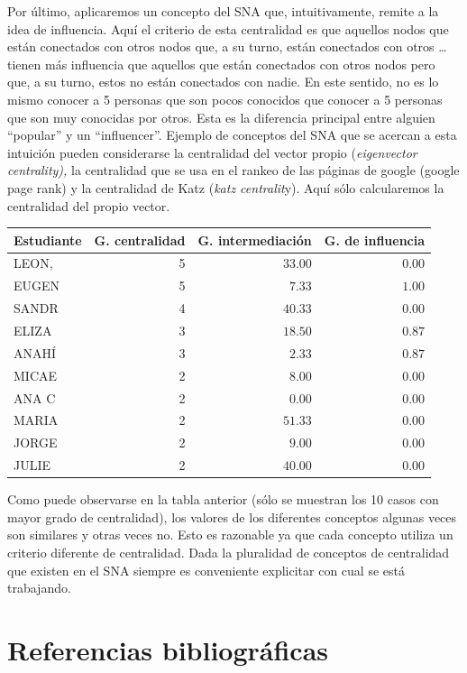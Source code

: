 \documentclass[
  letterpaper,
  DIV=11,
  numbers=noendperiod]{scrreprt}
\begin{document}
Por último, aplicaremos un concepto del SNA que, intuitivamente, remite
a la idea de influencia. Aquí el criterio de esta centralidad es que
aquellos nodos que están conectados con otros nodos que, a su turno,
están conectados con otros \ldots{} tienen más influencia que aquellos
que están conectados con otros nodos pero que, a su turno, estos no
están conectados con nadie. En este sentido, no es lo mismo conocer a 5
personas que son pocos conocidos que conocer a 5 personas que son muy
conocidas por otros. Esta es la diferencia principal entre alguien
``popular'' y un ``influencer''. Ejemplo de conceptos del SNA que se
acercan a esta intuición pueden considerarse la centralidad del vector
propio (\emph{eigenvector centrality),} la centralidad que se usa en el
rankeo de las páginas de google (google page rank) y la centralidad de
Katz (\emph{katz centralit}y). Aquí sólo calcularemos la centralidad del
propio vector.

\begin{longtable}{lrrr}
\toprule
Estudiante & G. centralidad & G. intermediación & G. de influencia \\ 
\midrule
LEON, & 5 & $33.00$ & $0.00$ \\ 
EUGEN & 5 & $7.33$ & $1.00$ \\ 
SANDR & 4 & $40.33$ & $0.00$ \\ 
ELIZA & 3 & $18.50$ & $0.87$ \\ 
ANAHÍ & 3 & $2.33$ & $0.87$ \\ 
MICAE & 2 & $8.00$ & $0.00$ \\ 
ANA C & 2 & $0.00$ & $0.00$ \\ 
MARIA & 2 & $51.33$ & $0.00$ \\ 
JORGE & 2 & $9.00$ & $0.00$ \\ 
JULIE & 2 & $40.00$ & $0.00$ \\ 
\bottomrule
\end{longtable}

Como puede observarse en la tabla anterior (sólo se muestran los 10
casos con mayor grado de centralidad), los valores de los diferentes
conceptos algunas veces son similares y otras veces no. Esto es
razonable ya que cada concepto utiliza un criterio diferente de
centralidad. Dada la pluralidad de conceptos de centralidad que existen
en el SNA siempre es conveniente explicitar con cual se está trabajando.


\hypertarget{referencias-bibliogruxe1ficas}{%
\chapter*{Referencias
bibliográficas}\label{referencias-bibliogruxe1ficas}}
\end{document}
